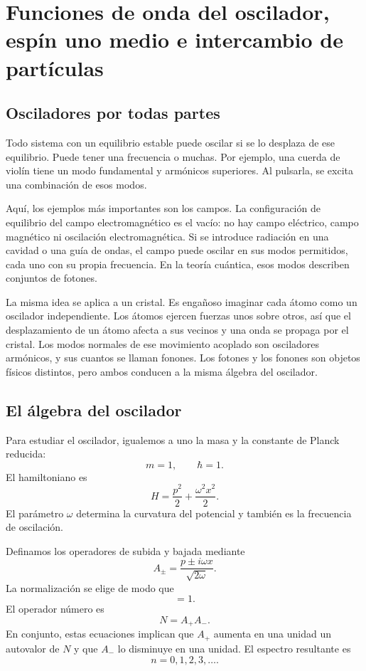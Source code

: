 \chapter{Funciones de onda del oscilador, espín uno medio e intercambio de partículas}

\section{Osciladores por todas partes}

Todo sistema con un equilibrio estable puede oscilar si se lo desplaza de ese equilibrio. Puede tener una frecuencia o muchas. Por ejemplo, una cuerda de violín tiene un modo fundamental y armónicos superiores. Al pulsarla, se excita una combinación de esos modos.

Aquí, los ejemplos más importantes son los campos. La configuración de equilibrio del campo electromagnético es el vacío: no hay campo eléctrico, campo magnético ni oscilación electromagnética. Si se introduce radiación en una cavidad o una guía de ondas, el campo puede oscilar en sus modos permitidos, cada uno con su propia frecuencia. En la teoría cuántica, esos modos describen conjuntos de fotones.

La misma idea se aplica a un cristal. Es engañoso imaginar cada átomo como un oscilador independiente. Los átomos ejercen fuerzas unos sobre otros, así que el desplazamiento de un átomo afecta a sus vecinos y una onda se propaga por el cristal. Los modos normales de ese movimiento acoplado son osciladores armónicos, y sus cuantos se llaman fonones. Los fotones y los fonones son objetos físicos distintos, pero ambos conducen a la misma álgebra del oscilador.

\section{El álgebra del oscilador}

Para estudiar el oscilador, igualemos a uno la masa y la constante de Planck reducida:
\[
m=1,\qquad \hbar=1.
\]
El hamiltoniano es
\begin{equation}
H=\frac{p^{2}}{2}+\frac{\omega^{2}x^{2}}{2}.
\end{equation}
El parámetro \(\omega\) determina la curvatura del potencial y también es la frecuencia de oscilación.

Definamos los operadores de subida y bajada mediante
\begin{equation}
A_{\pm}=\frac{p\pm i\omega x}{\sqrt{2\omega}}.
\end{equation}
La normalización se elige de modo que
\begin{equation}
[A_{-},A_{+}]=1.
\end{equation}
El operador número es
\begin{equation}
N=A_{+}A_{-}.
\end{equation}
En conjunto, estas ecuaciones implican que \(A_{+}\) aumenta en una unidad un autovalor de \(N\) y que \(A_{-}\) lo disminuye en una unidad. El espectro resultante es
\begin{equation}
n=0,1,2,3,\ldots .
\end{equation}

